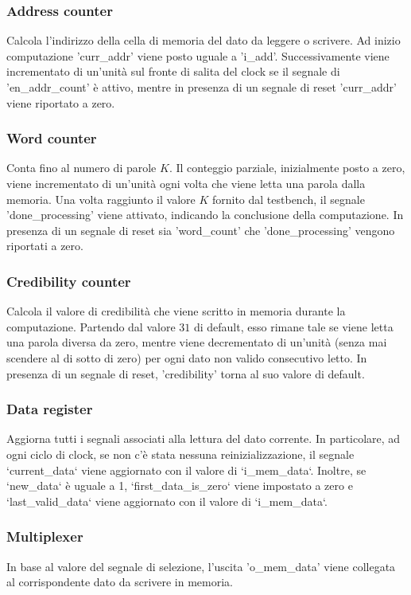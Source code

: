 \subsubsection{Address counter}
 Calcola l'indirizzo della cella di memoria del dato da leggere o scrivere.
 Ad inizio computazione 'curr\_addr' viene posto uguale a 'i\_add'.
 Successivamente viene incrementato di un'unità sul fronte di salita del clock se il segnale di 'en\_addr\_count' è attivo, mentre in presenza di un segnale di reset 'curr\_addr' viene riportato a zero.
\subsubsection{Word counter}
 Conta fino al numero di parole $K$.
 Il conteggio parziale, inizialmente posto a zero, viene incrementato di un'unità ogni volta che viene letta una parola dalla memoria.
 Una volta raggiunto il valore $K$ fornito dal testbench, il segnale 'done\_processing' viene attivato, indicando la conclusione della computazione.
 In presenza di un segnale di reset sia 'word\_count' che 'done\_processing' vengono riportati a zero.
\subsubsection{Credibility counter}
 Calcola il valore di credibilità che viene scritto in memoria durante la computazione.
 Partendo dal valore $31$ di default, esso rimane tale se viene letta una parola diversa da zero, mentre viene decrementato di un'unità (senza mai scendere al di sotto di zero) per ogni dato non valido consecutivo letto.
 In presenza di un segnale di reset, 'credibility' torna al suo valore di default.
\subsubsection{Data register}
Aggiorna tutti i segnali associati alla lettura del dato corrente.
In particolare, ad ogni ciclo di clock, se non c'è stata nessuna reinizializzazione, il segnale `current\_data` viene aggiornato con il valore di `i\_mem\_data`.
Inoltre, se `new\_data` è uguale a 1, `first\_data\_is\_zero` viene impostato a zero e `last\_valid\_data` viene aggiornato con il valore di `i\_mem\_data`.
\subsubsection{Multiplexer}
 In base al valore del segnale di selezione, l'uscita 'o\_mem\_data' viene collegata al corrispondente dato da scrivere in memoria.
